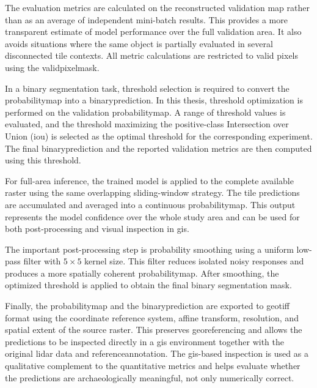The evaluation metrics are calculated on the reconstructed validation map rather than as an average of independent mini-batch results. This provides a more transparent estimate of model performance over the full validation area. It also avoids situations where the same object is partially evaluated in several disconnected tile contexts. All metric calculations are restricted to valid pixels using the \gls{validpixelmask}.

In a binary segmentation task, threshold selection is required to convert the \gls{probabilitymap} into a \gls{binaryprediction}. In this thesis, threshold optimization is performed on the validation \gls{probabilitymap}. A range of threshold values is evaluated, and the threshold maximizing the positive-class Intersection over Union (\gls{iou}) is selected as the optimal threshold for the corresponding experiment. The final \gls{binaryprediction} and the reported validation metrics are then computed using this threshold.

For full-area inference, the trained model is applied to the complete available raster using the same overlapping sliding-window strategy. The tile predictions are accumulated and averaged into a continuous \gls{probabilitymap}. This output represents the model confidence over the whole study area and can be used for both post-processing and visual inspection in \gls{gis}.

The important post-processing step is probability smoothing using a uniform low-pass filter with $5 \times 5$ kernel size. This filter reduces isolated noisy responses and produces a more spatially coherent \gls{probabilitymap}. After smoothing, the optimized threshold is applied to obtain the final binary segmentation mask. 

Finally, the \gls{probabilitymap} and the \gls{binaryprediction} are exported to \gls{geotiff} format using the coordinate reference system, affine transform, resolution, and spatial extent of the source raster. This preserves georeferencing and allows the predictions to be inspected directly in a \gls{gis} environment together with the original \gls{lidar} data and \gls{referenceannotation}. The \gls{gis}-based inspection is used as a qualitative complement to the quantitative metrics and helps evaluate whether the predictions are archaeologically meaningful, not only numerically correct.

